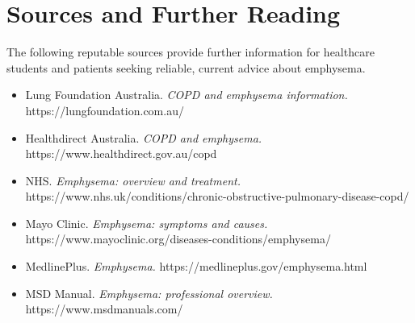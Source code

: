 \section*{Sources and Further Reading}
The following reputable sources provide further information for healthcare students and patients seeking reliable, current advice about emphysema.
\begin{itemize}
    \item Lung Foundation Australia. \textit{COPD and emphysema information.} https://lungfoundation.com.au/
    \item Healthdirect Australia. \textit{COPD and emphysema.} https://www.healthdirect.gov.au/copd
    \item NHS. \textit{Emphysema: overview and treatment.} https://www.nhs.uk/conditions/chronic-obstructive-pulmonary-disease-copd/
    \item Mayo Clinic. \textit{Emphysema: symptoms and causes.} https://www.mayoclinic.org/diseases-conditions/emphysema/
    \item MedlinePlus. \textit{Emphysema.} https://medlineplus.gov/emphysema.html
    \item MSD Manual. \textit{Emphysema: professional overview.} https://www.msdmanuals.com/
\end{itemize}
